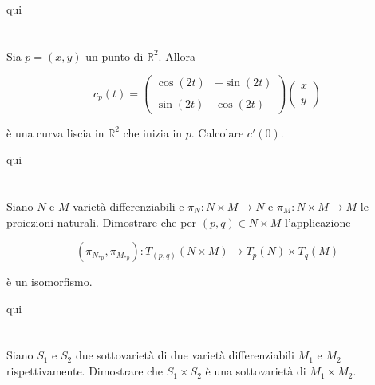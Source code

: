 qui

\section{}\label{es2-10}

\begin{tcolorbox}
	Sia $ p = (x,y) $ un punto di $ \mathbb{R}^{2} $. Allora
	
	\begin{equation}
		c_{p}(t) = \begin{pmatrix} \cos(2t) & -\sin(2t) \\\\ \sin(2t) & \cos(2t) \end{pmatrix} \begin{pmatrix} x \\\\ y \end{pmatrix}
	\end{equation}
	
	è una curva liscia in $ \mathbb{R}^{2} $ che inizia in $ p $. Calcolare $ c'(0) $.
\end{tcolorbox}

qui

\section{}\label{es2-11}

\begin{tcolorbox}
	Siano $ N $ e $ M $ varietà differenziabili e $ \pi_{N} : N \times M \to N $ e $ \pi_{M} : N \times M \to M $ le proiezioni naturali. Dimostrare che per $ (p,q) \in N \times M $ l'applicazione
	
	\begin{equation}
		(\pi_{N_{*p}},\pi_{M_{*p}}) : T_{(p,q)}(N \times M) \to T_{p}(N) \times T_{q}(M)
	\end{equation}
	
	è un isomorfismo.
\end{tcolorbox}

qui




\section{}\label{es2-12}

\begin{tcolorbox}
	Siano $ S_{1} $ e $ S_{2} $ due sottovarietà di due varietà differenziabili $ M_{1} $ e $ M_{2} $ rispettivamente. Dimostrare che $ S_{1} \times S_{2} $ è una sottovarietà di $ M_{1} \times M_{2} $.
\end{tcolorbox}

